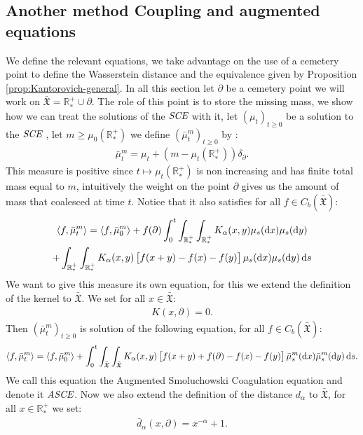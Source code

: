 \documentclass[11pt,a4paper]{article}
\newcommand{\RRP}{\mathbb{R}^+_*}
\newcommand{\XF}{\mathfrak{X}}
\newcommand{\SCE}{\emph{SCE}}
\newcommand{\ASCE}{{\emph{ASCE}}}
\newcommand{\Proc}[1]{\left(#1\right)_{t\geq 0}}
\newcommand{\brac}[1]{\left\langle#1\right\rangle}
\newcommand{\dd}{\mathop{}\!\mathrm{d}}
\begin{document}
\subsection{Another method Coupling and augmented equations}
We define the relevant equations, we take advantage on the use of a cemetery point to define the Wasserstein distance and the equivalence given by Proposition \ref{prop:Kantorovich-general}. In all this section let $\partial$ be a cemetery point we will work on $\bar{\XF} = \RRP \cup {\partial}$. The role of this point is to store the missing mass, we show how we can treat the solutions of the $\SCE$ with it, let $\Proc{\mu_t}$ be a solution to the $\SCE$ , let $m \geq \mu_0(\RRP)$ we define $\Proc{\bar{\mu}^m_t}$ by :
\begin{align*}
    \bar{\mu}^m_t = \mu_t + \left(m - \mu_t(\RRP) \right)\delta_\partial.
\end{align*}
This measure is positive since $t \mapsto \mu_t(\RRP)$ is non increasing and has finite total mass equal to $m$, intuitively the weight on the point $\partial$ gives us the amount of mass that coalesced at time $t$. Notice that it also satisfies for all $f \in C_b(\bar{\XF})$:
\begin{multline*}
    \brac{f,\bar{\mu}^m_t} = \brac{f,\bar{\mu}^m_0} + f(\partial) \int_0^t\int_{\RRP} \int_{\RRP} K_\alpha(x,y)\mu_s(\dd x) \mu_s(\dd y) \\
    + \int_{\RRP} \int_{\RRP} K_\alpha(x,y) \left[\vphantom{A^2}f(x+y)  -f(x) -f(y)\right]\mu_s(\dd x) \mu_s(\dd y) \dd s
\end{multline*}
We want to give this measure its own equation, for this we extend the definition of the kernel to $\bar{\XF}$. We set for all $x \in \bar{\XF}$:
\begin{align*}
    K(x,\partial) = 0.
\end{align*}
Then $\Proc{\bar{\mu}^m_t}$ is solution of the following equation, for all $f \in C_b(\bar{\XF})$:
\begin{align*}
    \brac{f,\bar{\mu}^m_t} = \brac{f,\bar{\mu}^m_0} + \int_0^t \int_{\bar{\XF}} \int_{\bar{\XF}} K_\alpha(x,y) \left[\vphantom{A^2}f(x+y) + f(\partial) -f(x) -f(y)\right]\bar{\mu}^m_s(\dd x) \bar{\mu}^m_s(\dd y) \dd s.
\end{align*}
We call this equation the Augmented Smoluchowski Coagulation equation and denote it $\ASCE$. Now we also extend the definition of the distance $d_\alpha$ to $\bar{\XF}$, for all $x \in \RRP$ we set:
\begin{align*}
    \bar{d}_\alpha(x,\partial) = x^{-\alpha} + 1.
\end{align*}
\end{document}
